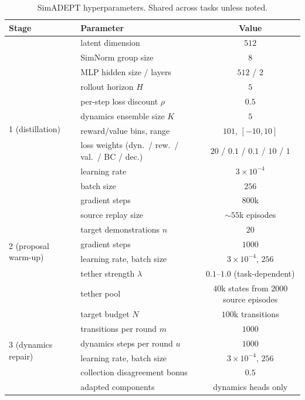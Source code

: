 \begin{table}[h]
\centering
\caption{SimADEPT hyperparameters. Shared across tasks unless noted.}
\label{tab:app-hparams}
\small
\begin{tabular}{llc}
\toprule
Stage & Parameter & Value \\
\midrule
\multirow{12}{*}{1 (distillation)}
 & latent dimension & $512$ \\
 & SimNorm group size & $8$ \\
 & MLP hidden size / layers & $512$ / $2$ \\
 & rollout horizon $H$ & $5$ \\
 & per-step loss discount $\rho$ & $0.5$ \\
 & dynamics ensemble size $K$ & $5$ \\
 & reward/value bins, range & $101$, $[-10, 10]$ \\
 & loss weights (dyn.\ / rew.\ / val.\ / BC / dec.) & $20$ / $0.1$ / $0.1$ / $10$ / $1$ \\
 & learning rate & $3\times10^{-4}$ \\
 & batch size & $256$ \\
 & gradient steps & $800$k \\
 & source replay size & $\sim$$55$k episodes \\
\midrule
\multirow{4}{*}{2 (proposal warm-up)}
 & target demonstrations $n$ & $20$ \\
 & gradient steps & $1000$ \\
 & learning rate, batch size & $3\times10^{-4}$, $256$ \\
 & tether strength $\lambda$ & $0.1$--$1.0$ (task-dependent) \\
 & tether pool & $40$k states from $2000$ source episodes \\
\midrule
\multirow{6}{*}{3 (dynamics repair)}
 & target budget $N$ & $100$k transitions \\
 & transitions per round $m$ & $1000$ \\
 & dynamics steps per round $u$ & $1000$ \\
 & learning rate, batch size & $3\times10^{-4}$, $256$ \\
 & collection disagreement bonus & $0.5$ \\
 & adapted components & dynamics heads only \\
\bottomrule
\end{tabular}
\end{table}

